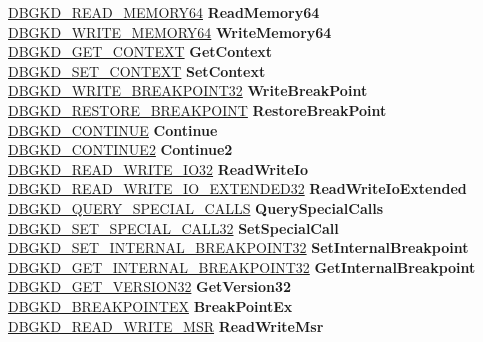 \begin{DoxyCompactItemize}
\begin{tabbing}
\>\hyperlink{struct___d_b_g_k_d___r_e_a_d___m_e_m_o_r_y64}{DBGKD\_READ\_MEMORY64} {\bfseries ReadMemory64}\\
\>\hyperlink{struct___d_b_g_k_d___w_r_i_t_e___m_e_m_o_r_y64}{DBGKD\_WRITE\_MEMORY64} {\bfseries WriteMemory64}\\
\>\hyperlink{struct___d_b_g_k_d___g_e_t___c_o_n_t_e_x_t}{DBGKD\_GET\_CONTEXT} {\bfseries GetContext}\\
\>\hyperlink{struct___d_b_g_k_d___s_e_t___c_o_n_t_e_x_t}{DBGKD\_SET\_CONTEXT} {\bfseries SetContext}\\
\>\hyperlink{struct___d_b_g_k_d___w_r_i_t_e___b_r_e_a_k_p_o_i_n_t32}{DBGKD\_WRITE\_BREAKPOINT32} {\bfseries WriteBreakPoint}\\
\>\hyperlink{struct___d_b_g_k_d___r_e_s_t_o_r_e___b_r_e_a_k_p_o_i_n_t}{DBGKD\_RESTORE\_BREAKPOINT} {\bfseries RestoreBreakPoint}\\
\>\hyperlink{struct___d_b_g_k_d___c_o_n_t_i_n_u_e}{DBGKD\_CONTINUE} {\bfseries Continue}\\
\>\hyperlink{struct___d_b_g_k_d___c_o_n_t_i_n_u_e2}{DBGKD\_CONTINUE2} {\bfseries Continue2}\\
\>\hyperlink{struct___d_b_g_k_d___r_e_a_d___w_r_i_t_e___i_o32}{DBGKD\_READ\_WRITE\_IO32} {\bfseries ReadWriteIo}\\
\>\hyperlink{struct___d_b_g_k_d___r_e_a_d___w_r_i_t_e___i_o___e_x_t_e_n_d_e_d32}{DBGKD\_READ\_WRITE\_IO\_EXTENDED32} {\bfseries ReadWriteIoExtended}\\
\>\hyperlink{struct___d_b_g_k_d___q_u_e_r_y___s_p_e_c_i_a_l___c_a_l_l_s}{DBGKD\_QUERY\_SPECIAL\_CALLS} {\bfseries QuerySpecialCalls}\\
\>\hyperlink{struct___d_b_g_k_d___s_e_t___s_p_e_c_i_a_l___c_a_l_l32}{DBGKD\_SET\_SPECIAL\_CALL32} {\bfseries SetSpecialCall}\\
\>\hyperlink{struct___d_b_g_k_d___s_e_t___i_n_t_e_r_n_a_l___b_r_e_a_k_p_o_i_n_t32}{DBGKD\_SET\_INTERNAL\_BREAKPOINT32} {\bfseries SetInternalBreakpoint}\\
\>\hyperlink{struct___d_b_g_k_d___g_e_t___i_n_t_e_r_n_a_l___b_r_e_a_k_p_o_i_n_t32}{DBGKD\_GET\_INTERNAL\_BREAKPOINT32} {\bfseries GetInternalBreakpoint}\\
\>\hyperlink{struct___d_b_g_k_d___g_e_t___v_e_r_s_i_o_n32}{DBGKD\_GET\_VERSION32} {\bfseries GetVersion32}\\
\>\hyperlink{struct___d_b_g_k_d___b_r_e_a_k_p_o_i_n_t_e_x}{DBGKD\_BREAKPOINTEX} {\bfseries BreakPointEx}\\
\>\hyperlink{struct___d_b_g_k_d___r_e_a_d___w_r_i_t_e___m_s_r}{DBGKD\_READ\_WRITE\_MSR} {\bfseries ReadWriteMsr}\\

\end{tabbing}
\end{DoxyCompactItemize}
